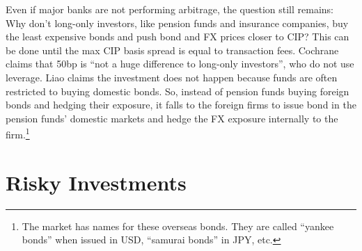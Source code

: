 
Even if major banks are not performing arbitrage, the question still remains: Why don't long-only investors, like pension funds and insurance companies, buy the least expensive bonds and push bond and FX prices closer to CIP?  This can be done until the max CIP basis spread is equal to transaction fees.  Cochrane claims that 50bp is ``not a huge difference to long-only investors''\cite{Cochrane2017}, who do not use leverage.  Liao claims the investment does not happen because funds are often restricted to buying domestic bonds.\cite{Liao2016}  So, instead of pension funds buying foreign bonds and hedging their exposure, it falls to the foreign firms to issue bond in the pension funds' domestic markets and hedge the FX exposure internally to the firm.\footnote{The market has names for these overseas bonds.  They are called ``yankee bonds'' when issued in USD, ``samurai bonds'' in JPY, etc.}










\section{Risky Investments}


